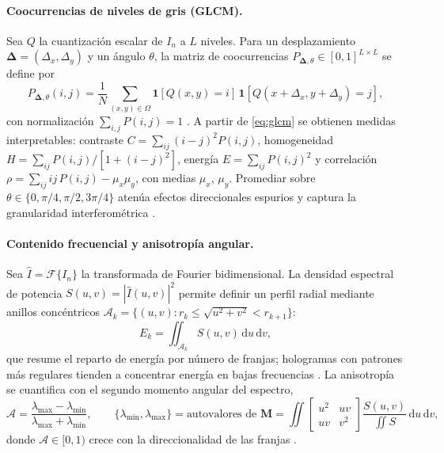 \paragraph{Coocurrencias de niveles de gris (GLCM).}
Sea \(Q\) la cuantización escalar de \(I_{n}\) a \(L\) niveles. Para un desplazamiento \(\boldsymbol{\Delta}=(\Delta_{x},\Delta_{y})\) y un ángulo \(\theta\), la matriz de coocurrencias \(P_{\boldsymbol{\Delta},\theta}\in[0,1]^{L\times L}\) se define por
\begin{equation}
P_{\boldsymbol{\Delta},\theta}(i,j)=\frac{1}{N}\sum_{(x,y)\in\Omega}
\mathbf{1}\!\left[Q(x,y)=i\right]\,
\mathbf{1}\!\left[Q(x+\Delta_{x},y+\Delta_{y})=j\right],
\label{eq:glcm}
\end{equation}
con normalización \(\sum_{i,j}P(i,j)=1\) \cite{Barburiceanu2021}. A partir de \eqref{eq:glcm} se obtienen medidas interpretables: contraste \(C=\sum_{ij}(i-j)^{2}P(i,j)\), homogeneidad \(H=\sum_{ij}P(i,j)/[1+(i-j)^{2}]\), energía \(E=\sum_{ij}P(i,j)^{2}\) y correlación \(\rho=\sum_{ij} ij\,P(i,j)-\mu_{x}\mu_{y}\), con medias \(\mu_{x}\), \(\mu_{y}\). Promediar sobre \(\theta\in\{0,\pi/4,\pi/2,3\pi/4\}\) atenúa efectos direccionales espurios y captura la granularidad interferométrica \cite{Barburiceanu2021}.

\paragraph{Contenido frecuencial y anisotropía angular.}
Sea \(\widehat I=\mathcal{F}\{I_{n}\}\) la transformada de Fourier bidimensional. La densidad espectral de potencia \(S(u,v)=|\widehat I(u,v)|^{2}\) permite definir un perfil radial mediante anillos concéntricos \(\mathcal{A}_{k}=\{(u,v): r_{k}\le\sqrt{u^{2}+v^{2}}<r_{k+1}\}\):
\begin{equation}
E_{k}=\iint_{\mathcal{A}_{k}} S(u,v)\, \mathrm{d}u\,\mathrm{d}v,
\label{eq:ringenergy}
\end{equation}
que resume el reparto de energía por número de franjas; hologramas con patrones más regulares tienden a concentrar energía en bajas frecuencias \cite{Amann2019,OConnor2020}. La anisotropía se cuantifica con el segundo momento angular del espectro,
\begin{equation}
\mathcal{A}=\frac{\lambda_{\max}-\lambda_{\min}}{\lambda_{\max}+\lambda_{\min}},\qquad
\{\lambda_{\min},\lambda_{\max}\}=\text{autovalores de } \mathbf{M}=\iint
\begin{bmatrix} u^{2} & uv \\ uv & v^{2}\end{bmatrix}
\frac{S(u,v)}{\iint S}\,\mathrm{d}u\,\mathrm{d}v,
\label{eq:anisotropy}
\end{equation}
donde \(\mathcal{A}\in[0,1)\) crece con la direccionalidad de las franjas \cite{Amann2019}.

